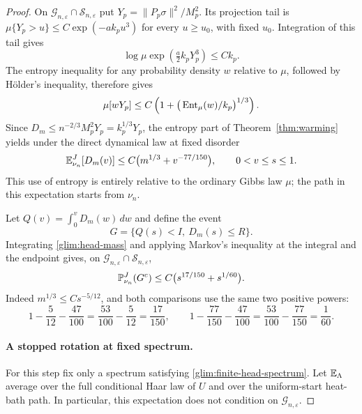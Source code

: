 \begin{proof}
On \(\mathcal G_{n,\varepsilon}\cap\mathcal S_{n,\varepsilon}\) put
\(Y_p=\|P_p\sigma\|^2/M_p^2\).  Its
projection tail is
\(\mu\{Y_p>u\}\le C\exp(-a k_pu^3)\) for every \(u\ge u_0\), with
fixed \(u_0\).  Integration of this tail gives
\[
 \log\mu\exp\!\left(\tfrac a2 k_pY_p^3\right)\le C k_p.
\]
The entropy inequality for any probability density \(w\) relative
to \(\mu\), followed by Hölder's inequality, therefore gives
\[
 \mu[wY_p]\le
 C\left(1+\big(\operatorname{Ent}_\mu(w)/k_p\big)^{1/3}\right).
\]
Since \(D_m\le n^{-2/3}M_p^2Y_p=k_p^{1/3}Y_p\), the entropy part of
Theorem~\ref{thm:warming} yields under the direct dynamical law at
fixed disorder
\begin{equation}
 \mathbb E_{\nu_n}^J[D_m(v)]
 \le C\big(m^{1/3}+v^{-77/150}\big),\qquad 0<v\le s\le1.
 \label{glim:head-mass}
\end{equation}
This use of entropy is entirely relative to the ordinary Gibbs law
\(\mu\); the path in this expectation starts from \(\nu_n\).

Let \(Q(v)=\int_0^vD_m(w)\,dw\) and define the event
\[
 G=\{Q(s)<I,\ D_m(s)\le R\}.
\]
Integrating \eqref{glim:head-mass} and applying Markov's inequality
at the integral and the endpoint gives, on
\(\mathcal G_{n,\varepsilon}\cap\mathcal S_{n,\varepsilon}\),
\begin{equation}
 \mathbb P_{\nu_n}^J(G^c)
 \le C\big(s^{17/150}+s^{1/60}\big).
 \label{glim:cutoff-loss}
\end{equation}
Indeed \(m^{1/3}\le C s^{-5/12}\), and both comparisons use the
same two positive powers:
\[
 1-\frac5{12}-\frac{47}{100}
   =\frac{53}{100}-\frac5{12}=\frac{17}{150},\qquad
 1-\frac{77}{150}-\frac{47}{100}
   =\frac{53}{100}-\frac{77}{150}=\frac1{60}.
\]

\paragraph{A stopped rotation at fixed spectrum.}
For this step fix only a spectrum satisfying
\eqref{glim:finite-head-spectrum}.  Let \(\mathbb E_\Lambda\) average over
the full conditional Haar law of \(U\) and over the uniform-start
heat-bath path.  In particular, this expectation does not condition
on \(\mathcal G_{n,\varepsilon}\).


\end{proof}
